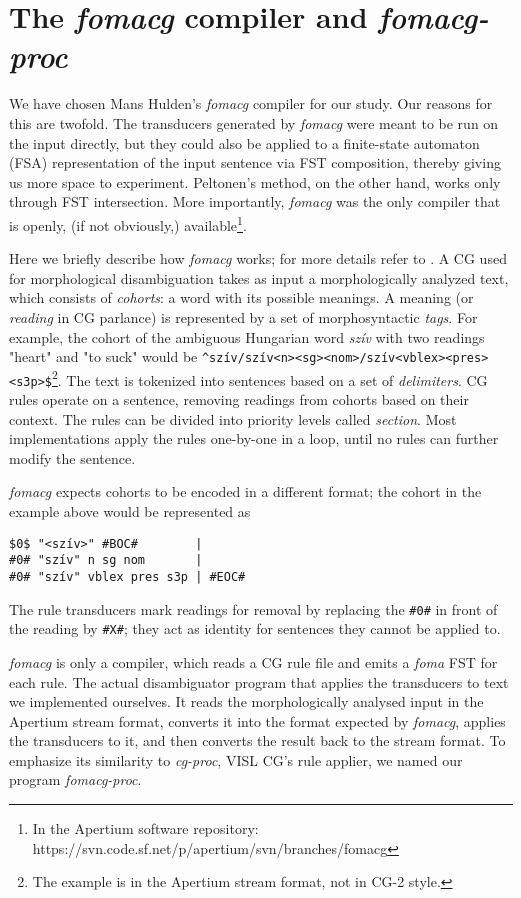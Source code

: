 \documentclass[11pt]{article}
\begin{document}
\section{The \emph{fomacg} compiler and \emph{fomacg-proc}}
\label{sec:fomacg}

We have chosen Mans Hulden's \emph{fomacg} compiler for our study. Our
reasons for this are twofold. The transducers generated by \emph{fomacg} were
meant to be run on the input directly, but they could also be applied to a
finite-state automaton (FSA) representation of the input sentence via FST
composition, thereby giving us more space to experiment. Peltonen's method,
on the other hand, works only through FST intersection. More importantly,
\emph{fomacg} was the only compiler that is openly, (if not obviously,)
available\footnote{In the Apertium software repository:
https://svn.code.sf.net/p/apertium/svn/branches/fomacg}.

Here we briefly describe how \emph{fomacg} works; for more details refer to
\cite{Hulden:2011}. A CG used for morphological disambiguation takes as input
a morphologically analyzed text, which consists of \emph{cohorts}: a word with
its possible meanings. A meaning (or \emph{reading} in CG parlance) is
represented by a set of morphosyntactic \emph{tags}. For example, the cohort of
the ambiguous Hungarian word \textit{szív} with two readings "heart" and
"to suck" would be
\texttt{\^{}szív/szív<n><sg><nom>/szív<vblex><pres><s3p>\$}\footnote{
The example is in the Apertium stream format, not in CG-2 style.}. The text is
tokenized into sentences based on a set of \emph{delimiters}. CG rules
operate on a sentence, removing readings from cohorts based on their context.
The rules can be divided into priority levels called \emph{section}. Most
implementations apply the rules one-by-one in a loop, until no rules can further
modify the sentence.

\emph{fomacg} expects cohorts to be encoded in a different format; the cohort in
the example above would be represented as
\begin{verbatim}
$0$ "<szív>" #BOC#        |
#0# "szív" n sg nom       |
#0# "szív" vblex pres s3p | #EOC#
\end{verbatim}
The rule transducers mark readings for removal by replacing the \texttt{\#0\#}
in front of the reading by \texttt{\#X\#}; they act as identity for sentences
they cannot be applied to.

\emph{fomacg} is only a compiler, which reads a CG rule file and emits a
\emph{foma} FST for each rule. The actual disambiguator program that applies the
transducers to text we implemented ourselves. It reads the morphologically
analysed input in the Apertium stream format, converts it into the format
expected by \emph{fomacg}, applies the transducers to it, and then converts the
result back to the stream format. To emphasize its similarity to \emph{cg-proc},
VISL CG's rule applier, we named our program \emph{fomacg-proc}.
\end{document}

